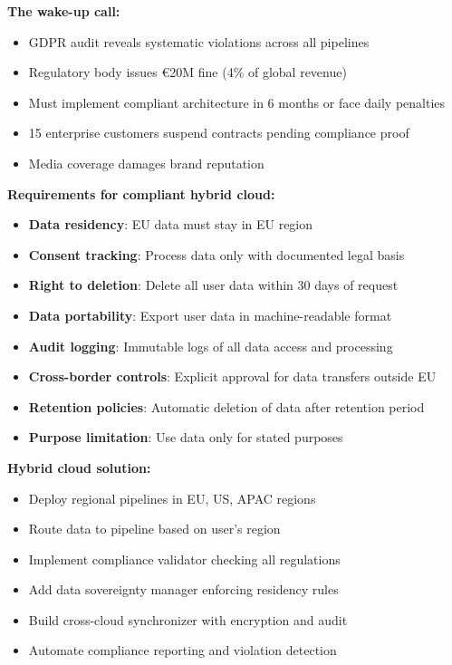 \textbf{The wake-up call:}
\begin{itemize}
    \item GDPR audit reveals systematic violations across all pipelines
    \item Regulatory body issues €20M fine (4\% of global revenue)
    \item Must implement compliant architecture in 6 months or face daily penalties
    \item 15 enterprise customers suspend contracts pending compliance proof
    \item Media coverage damages brand reputation
\end{itemize}

\textbf{Requirements for compliant hybrid cloud:}
\begin{itemize}
    \item \textbf{Data residency}: EU data must stay in EU region
    \item \textbf{Consent tracking}: Process data only with documented legal basis
    \item \textbf{Right to deletion}: Delete all user data within 30 days of request
    \item \textbf{Data portability}: Export user data in machine-readable format
    \item \textbf{Audit logging}: Immutable logs of all data access and processing
    \item \textbf{Cross-border controls}: Explicit approval for data transfers outside EU
    \item \textbf{Retention policies}: Automatic deletion of data after retention period
    \item \textbf{Purpose limitation}: Use data only for stated purposes
\end{itemize}

\textbf{Hybrid cloud solution:}
\begin{itemize}
    \item Deploy regional pipelines in EU, US, APAC regions
    \item Route data to pipeline based on user's region
    \item Implement compliance validator checking all regulations
    \item Add data sovereignty manager enforcing residency rules
    \item Build cross-cloud synchronizer with encryption and audit
    \item Automate compliance reporting and violation detection
\end{itemize}

